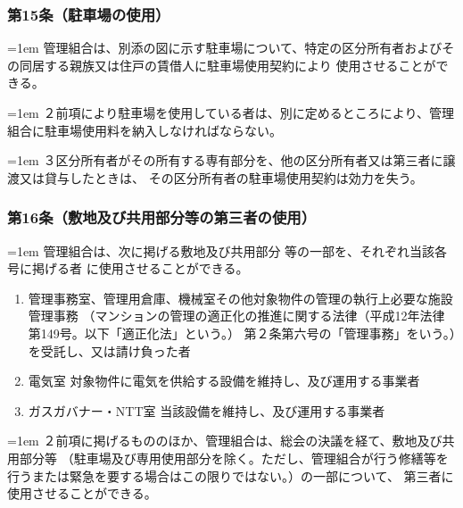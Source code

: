 \documentclass[
  twoside,
  luatex,
  paper=a4paper,
  fontsize=11pt,
  jafontsize=11pt,
  jlreq_notes,
]{jlreq}
\newcommand{\joumain}[1]{%
  \noindent\hangindent=1em\hangafter=1
  \hspace{1em}#1%
}
\newcommand{\kou}[2]{%
  \par\noindent\hangindent=1em\hangafter=1
  #1\hspace{1em}#2%
}
\begin{document}
  \subsubsection*{第15条（駐車場の使用）}
  \joumain{管理組合は、別添の図に示す駐車場について、特定の区分所有者およびその同居する親族又は住戸の賃借人に駐車場使用契約により
  使用させることができる。}
  \kou{２}{前項により駐車場を使用している者は、別に定めるところにより、管理組合に駐車場使用料を納入しなければならない。}
  \kou{３}{区分所有者がその所有する専有部分を、他の区分所有者又は第三者に譲渡又は貸与したときは、 その区分所有者の駐車場使用契約は効力を失う。}

  \subsubsection*{第16条（敷地及び共用部分等の第三者の使用）}
  \joumain{管理組合は、次に掲げる敷地及び共用部分 等の一部を、それぞれ当該各号に掲げる者 に使用させることができる。}
  \begin{enumerate}
    \item 管理事務室、管理用倉庫、機械室その他対象物件の管理の執行上必要な施設 管理事務
      （マンションの管理の適正化の推進に関する法律（平成12年法律第149号。以下「適正化法」という。）
      第２条第六号の「管理事務」をいう。）を受託し、又は請け負った者
    \item 電気室 対象物件に電気を供給する設備を維持し、及び運用する事業者
    \item ガスガバナー・NTT室 当該設備を維持し、及び運用する事業者
  \end{enumerate}
  \kou{２}{前項に掲げるもののほか、管理組合は、総会の決議を経て、敷地及び共用部分等
  （駐車場及び専用使用部分を除く。ただし、管理組合が行う修繕等を行うまたは緊急を要する場合はこの限りではない。）の一部について、
  第三者に使用させることができる。}
\end{document}
